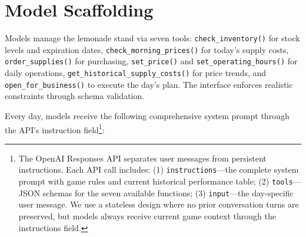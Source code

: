 \documentclass[11pt]{article}
\begin{document}
\section{Model Scaffolding}
\label{sec:scaffolding}

Models manage the lemonade stand via seven tools: \texttt{check\_inventory()} for stock levels and expiration dates, \texttt{check\_morning\_prices()} for today's supply costs, \texttt{order\_supplies()} for purchasing, \texttt{set\_price()} and \texttt{set\_operating\_hours()} for daily operations, \texttt{get\_historical\_supply\_costs()} for price trends, and \texttt{open\_for\_business()} to execute the day's plan. The interface enforces realistic constraints through schema validation.

Every day, models receive the following comprehensive system prompt through the API's instruction field\footnote{The OpenAI Responses API separates user messages from persistent instructions. Each API call includes: (1) \texttt{instructions}—the complete system prompt with game rules and current historical performance table; (2) \texttt{tools}—JSON schemas for the seven available functions; (3) \texttt{input}—the day-specific user message. We use a stateless design where no prior conversation turns are preserved, but models always receive current game context through the instructions field.}:
\end{document}
